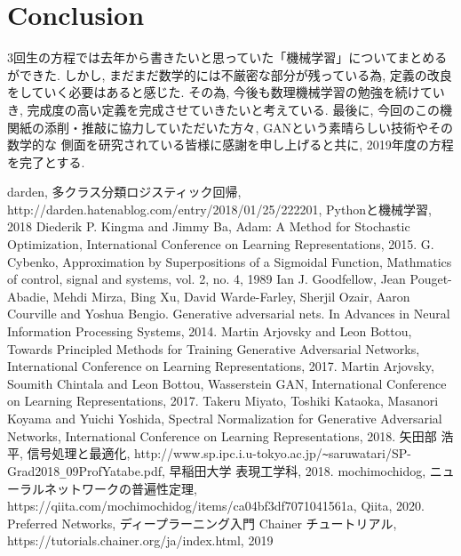 \documentclass[11pt, a4paper, dvipdfmx]{jsarticle}
\theoremstyle{definition}
\begin{document}
\section{Conclusion}
3回生の方程では去年から書きたいと思っていた「機械学習」についてまとめるができた. 
しかし, まだまだ数学的には不厳密な部分が残っている為, 定義の改良をしていく必要はあると感じた. 
その為, 今後も数理機械学習の勉強を続けていき, 完成度の高い定義を完成させていきたいと考えている. 
最後に, 今回のこの機関紙の添削・推敲に協力していただいた方々, GANという素晴らしい技術やその数学的な
側面を研究されている皆様に感謝を申し上げると共に, 2019年度の方程を完了とする. 
\begin{thebibliography}{20}
     darden, 多クラス分類ロジスティック回帰, \\
    http://darden.hatenablog.com/entry/2018/01/25/222201, Pythonと機械学習, 2018
     Diederik P. Kingma and Jimmy Ba, Adam: A Method for Stochastic Optimization, 
    International Conference on Learning Representations, 2015.
     G. Cybenko, Approximation by Superpositions of a Sigmoidal Function, Mathmatics of control, signal and systems, vol. 2, no. 4, 1989
     Ian J. Goodfellow, Jean Pouget-Abadie, Mehdi Mirza, Bing Xu, David Warde-Farley, Sherjil Ozair, Aaron Courville and Yoshua Bengio. 
    Generative adversarial nets. In Advances in Neural Information Processing Systems, 2014.
    Martin Arjovsky and Leon Bottou, Towards Principled Methods for Training Generative Adversarial Networks,
    International Conference on Learning Representations, 2017.
     Martin Arjovsky, Soumith Chintala and Leon Bottou, Wasserstein GAN, 
    International Conference on Learning Representations, 2017.
    Takeru Miyato, Toshiki Kataoka, Masanori Koyama and Yuichi Yoshida, Spectral Normalization for Generative Adversarial Networks, 
    International Conference on Learning Representations, 2018.
     矢田部 浩平, 信号処理と最適化, http://www.sp.ipc.i.u-tokyo.ac.jp/\verb|~|saruwatari/SP-Grad2018\verb|_|09ProfYatabe.pdf, 早稲田大学 表現工学科, 2018.
     mochimochidog, ニューラルネットワークの普遍性定理, \\
    https://qiita.com/mochimochidog/items/ca04bf3df7071041561a, Qiita, 2020.
    \bibitem{} Preferred Networks, ディープラーニング入門 Chainer チュートリアル,\\
    https://tutorials.chainer.org/ja/index.html, 2019
\end{thebibliography}
\end{document}
